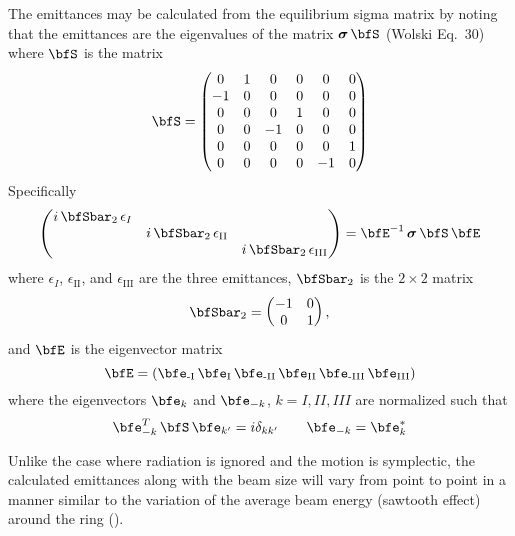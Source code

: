 The emittances may be calculated from the equilibrium sigma matrix by noting that the emittances are
the eigenvalues of the matrix $\bfsig \, \bfS$ (Wolski\cite{b:wolski.coupling} Eq.~30) where $\bfS$
is the matrix
\begin{equation}
  \bfS = \begin{pmatrix}
      0 &  1 &  0 &  0 &  0 &  0 \\
     -1 &  0 &  0 &  0 &  0 &  0 \\
      0 &  0 &  0 &  1 &  0 &  0 \\
      0 &  0 & -1 &  0 &  0 &  0 \\
      0 &  0 &  0 &  0 &  0 &  1 \\
      0 &  0 &  0 &  0 & -1 &  0 \\
  \end{pmatrix}
\end{equation}
Specifically
\begin{equation}
  \begin{pmatrix}
        i \, \bfSbar_2 \, \epsilon_I     & & \\
    &   i \, \bfSbar_2 \, \epsilon_\text{II}  & \\
    & & i \, \bfSbar_2 \, \epsilon_\text{III}
  \end{pmatrix} =
  \bfE^{-1} \, \bfsig \, \bfS \, \bfE
\end{equation}
where $\epsilon_I$, $\epsilon_\text{II}$, and $\epsilon_\text{III}$ are the three emittances, 
$\bfSbar_2$ is the $2\times2$ matrix
\begin{equation}
  \bfSbar_2 = \begin{pmatrix}
    -1 & 0 \\
     0 & 1
  \end{pmatrix},
\end{equation}
and $\bfE$ is the eigenvector matrix
\begin{equation}
  \bfE = (\bfe_\text{-I} \, \bfe_\text{I} \, \bfe_\text{-II} \, \bfe_\text{II} \, \bfe_\text{-III} \, \bfe_\text{III})
\end{equation}
where the eigenvectors $\bfe_k$ and $\bfe_{-k}$, $k = I, II, III$ are normalized such that
\begin{equation}
   \bfe_{-k}^T \, \bfS \, \bfe_{k'} = i \delta_{kk'} \qquad \bfe_{-k} = \bfe_k^*
\end{equation}

Unlike the case where radiation is ignored and the motion is symplectic, the calculated emittances
along with the beam size will vary from point to point in a manner similar to the variation of the average
beam energy (sawtooth effect) around the ring ().

